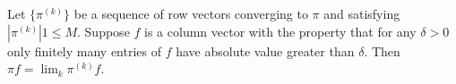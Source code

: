 Let $\{\pi^{(k)}\}$ be a sequence of row vectors converging to $\pi$ and satisfying $|\pi^{(k)}|1 \leq M$. Suppose $f$ is a column vector with the property that for any $\delta > 0$ only finitely many entries of $f$ have absolute value greater than $\delta$. Then $\pi f = \lim_k \pi^{(k)} f$.
